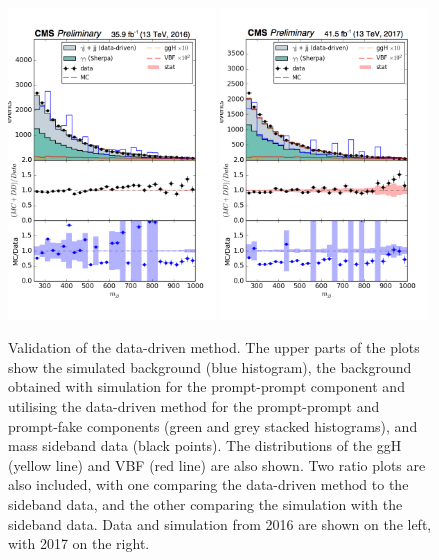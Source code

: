\begin{figure}
  \centering
  \includegraphics[width=0.49\textwidth]{Figures/Categorisation/DDvalidation_mjj2016.png}
  \includegraphics[width=0.49\textwidth]{Figures/Categorisation/DDvalidation_mjj2017.png}
  \caption{Validation of the data-driven method. 
  The upper parts of the plots show the simulated background (blue histogram), 
  the background obtained with simulation for the prompt-prompt component 
  and utilising the data-driven method for the prompt-prompt and prompt-fake components 
  (green and grey stacked histograms),
  and mass sideband data (black points).
  The distributions of the ggH (yellow line) and VBF (red line) are also shown.
  Two ratio plots are also included, with one comparing the data-driven method to the sideband data, 
  and the other comparing the simulation with the sideband data.
  Data and simulation from 2016 are shown on the left, with 2017 on the right.
  }
  \label{fig:cat_DDvalidation}
\end{figure}

